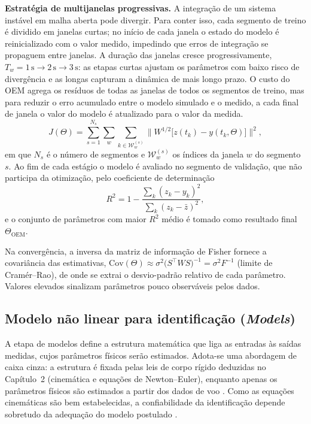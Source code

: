 \textbf{Estratégia de multijanelas progressivas.} A integração de um sistema instável em malha aberta pode divergir. Para conter isso, cada segmento de treino é dividido em janelas curtas; no início de cada janela o estado do modelo é reinicializado com o valor medido, impedindo que erros de integração se propaguem entre janelas. A duração das janelas cresce progressivamente, $T_w = 1\,\text{s} \to 2\,\text{s} \to 3\,\text{s}$: as etapas curtas ajustam os parâmetros com baixo risco de divergência e as longas capturam a dinâmica de mais longo prazo. O custo do OEM agrega os resíduos de todas as janelas de todos os segmentos de treino, mas para reduzir o erro acumulado entre o modelo simulado e o medido, a cada final de janela o valor do modelo é atualizado para o valor da medida.
\begin{equation}
J(\Theta) = \sum_{s=1}^{N_s} \sum_{w} \sum_{k \in \mathcal{W}_w^{(s)}} \big\| W^{1/2}\big[z(t_k) - y(t_k,\Theta)\big]\big\|^2,
\label{eq:oem-multiwin}
\end{equation}
em que $N_s$ é o número de segmentos e $\mathcal{W}_w^{(s)}$ os índices da janela $w$ do segmento $s$. Ao fim de cada estágio o modelo é avaliado no segmento de validação, que não participa da otimização, pelo coeficiente de determinação
\begin{equation}
R^2 = 1 - \frac{\sum_k (z_k - y_k)^2}{\sum_k (z_k - \bar{z})^2},
\label{eq:r2}
\end{equation}
e o conjunto de parâmetros com maior $R^2$ médio é tomado como resultado final $\Theta_{\text{OEM}}$.

Na convergência, a inversa da matriz de informação de Fisher fornece a covariância das estimativas, $\mathrm{Cov}(\Theta) \approx \sigma^2 \big(S^\top W S\big)^{-1} = \sigma^2 F^{-1}$ (limite de Cramér--Rao), de onde se extrai o desvio-padrão relativo de cada parâmetro. Valores elevados sinalizam parâmetros pouco observáveis pelos dados.

\subsection{Modelo não linear para identificação (\textit{Models})}

A etapa de modelos define a estrutura matemática que liga as entradas às saídas medidas, cujos parâmetros físicos serão estimados. Adota-se uma abordagem de caixa cinza: a estrutura é fixada pelas leis de corpo rígido deduzidas no Capítulo~2 (cinemática e equações de Newton--Euler), enquanto apenas os parâmetros físicos são estimados a partir dos dados de voo \cite{Aguirre2015}. Como as equações cinemáticas são bem estabelecidas, a confiabilidade da identificação depende sobretudo da adequação do modelo postulado \cite{Jategaonkar2015}.

